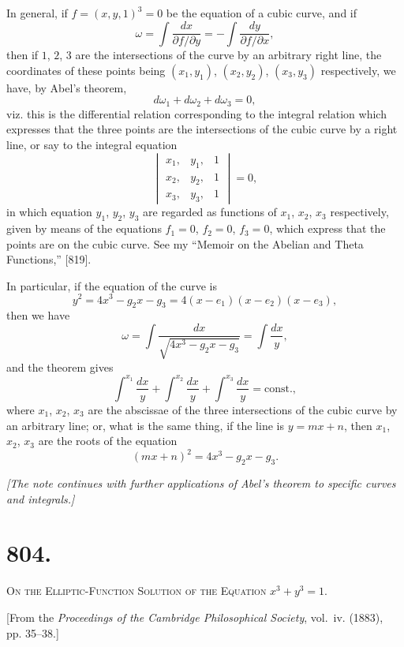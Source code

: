 \documentclass[11pt,a4paper]{book}
\begin{document}
In general, if $f = (x, y, 1)^3 = 0$ be the equation of a cubic curve, and if
\[
\omega = \int \frac{dx}{\partial f / \partial y} = -\int \frac{dy}{\partial f / \partial x},
\]
then if $1$, $2$, $3$ are the intersections of the curve by an arbitrary right line, the coordinates of these points being $(x_1, y_1)$, $(x_2, y_2)$, $(x_3, y_3)$ respectively, we have, by Abel's theorem,
\[
d\omega_1 + d\omega_2 + d\omega_3 = 0,
\]
viz. this is the differential relation corresponding to the integral relation which expresses that the three points are the intersections of the cubic curve by a right line, or say to the integral equation
\[
\begin{vmatrix}
x_1, & y_1, & 1 \\
x_2, & y_2, & 1 \\
x_3, & y_3, & 1
\end{vmatrix} = 0,
\]
in which equation $y_1$, $y_2$, $y_3$ are regarded as functions of $x_1$, $x_2$, $x_3$ respectively, given by means of the equations $f_1 = 0$, $f_2 = 0$, $f_3 = 0$, which express that the points are on the cubic curve. See my ``Memoir on the Abelian and Theta Functions,'' [819].

In particular, if the equation of the curve is
\[
y^2 = 4x^3 - g_2 x - g_3 = 4(x - e_1)(x - e_2)(x - e_3),
\]
then we have
\[
\omega = \int \frac{dx}{\sqrt{4x^3 - g_2 x - g_3}} = \int \frac{dx}{y},
\]
and the theorem gives
\[
\int^{x_1} \frac{dx}{y} + \int^{x_2} \frac{dx}{y} + \int^{x_3} \frac{dx}{y} = \text{const.},
\]
where $x_1$, $x_2$, $x_3$ are the abscissae of the three intersections of the cubic curve by an arbitrary line; or, what is the same thing, if the line is $y = mx + n$, then $x_1$, $x_2$, $x_3$ are the roots of the equation
\[
(mx + n)^2 = 4x^3 - g_2 x - g_3.
\]

\vspace{0.5cm}
\noindent\textit{[The note continues with further applications of Abel's theorem to specific curves and integrals.]}
\vspace{0.5cm}



\newpage
\section*{804.}
\begin{center}
{\large\scshape On the Elliptic-Function Solution of the Equation $x^3 + y^3 = 1$.}
\end{center}

\begin{flushright}
\small[From the \textit{Proceedings of the Cambridge Philosophical Society}, vol.~iv. (1883),\\
pp. 35--38.]
\end{flushright}
\end{document}
